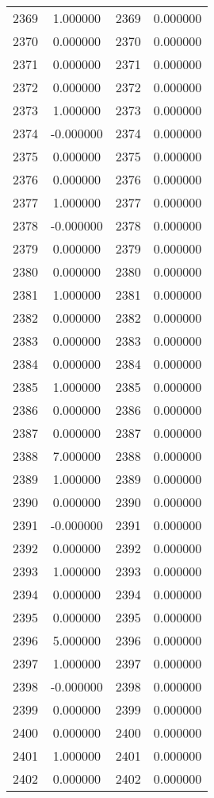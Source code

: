 \documentclass[12pt]{article}
\begin{document}
\begin{longtable}{@{}cccc@{}}
2369 & 1.000000 & 2369 & 0.000000 \\
2370 & 0.000000 & 2370 & 0.000000 \\
2371 & 0.000000 & 2371 & 0.000000 \\
2372 & 0.000000 & 2372 & 0.000000 \\
2373 & 1.000000 & 2373 & 0.000000 \\
2374 & -0.000000 & 2374 & 0.000000 \\
2375 & 0.000000 & 2375 & 0.000000 \\
2376 & 0.000000 & 2376 & 0.000000 \\
2377 & 1.000000 & 2377 & 0.000000 \\
2378 & -0.000000 & 2378 & 0.000000 \\
2379 & 0.000000 & 2379 & 0.000000 \\
2380 & 0.000000 & 2380 & 0.000000 \\
2381 & 1.000000 & 2381 & 0.000000 \\
2382 & 0.000000 & 2382 & 0.000000 \\
2383 & 0.000000 & 2383 & 0.000000 \\
2384 & 0.000000 & 2384 & 0.000000 \\
2385 & 1.000000 & 2385 & 0.000000 \\
2386 & 0.000000 & 2386 & 0.000000 \\
2387 & 0.000000 & 2387 & 0.000000 \\
2388 & 7.000000 & 2388 & 0.000000 \\
2389 & 1.000000 & 2389 & 0.000000 \\
2390 & 0.000000 & 2390 & 0.000000 \\
2391 & -0.000000 & 2391 & 0.000000 \\
2392 & 0.000000 & 2392 & 0.000000 \\
2393 & 1.000000 & 2393 & 0.000000 \\
2394 & 0.000000 & 2394 & 0.000000 \\
2395 & 0.000000 & 2395 & 0.000000 \\
2396 & 5.000000 & 2396 & 0.000000 \\
2397 & 1.000000 & 2397 & 0.000000 \\
2398 & -0.000000 & 2398 & 0.000000 \\
2399 & 0.000000 & 2399 & 0.000000 \\
2400 & 0.000000 & 2400 & 0.000000 \\
2401 & 1.000000 & 2401 & 0.000000 \\
2402 & 0.000000 & 2402 & 0.000000 \\

\end{longtable}
\end{document}
